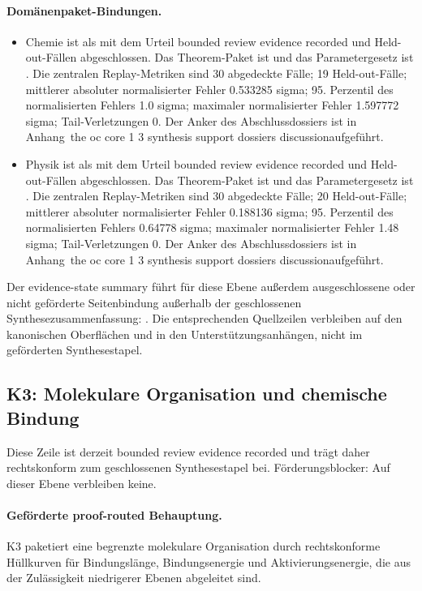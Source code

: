 \paragraph{Domänenpaket-Bindungen.}
\begin{itemize}[leftmargin=1.6em,nosep]
\item Chemie ist als  mit dem Urteil bounded review evidence recorded und  Held-out-Fällen abgeschlossen. Das Theorem-Paket ist  und das Parametergesetz ist . Die zentralen Replay-Metriken sind 30 abgedeckte Fälle; 19 Held-out-Fälle; mittlerer absoluter normalisierter Fehler 0.533285 sigma; 95. Perzentil des normalisierten Fehlers 1.0 sigma; maximaler normalisierter Fehler 1.597772 sigma; Tail-Verletzungen 0. Der Anker des Abschlussdossiers ist in Anhang~the oc core 1 3 synthesis support dossiers discussionaufgeführt.
\item Physik ist als  mit dem Urteil bounded review evidence recorded und  Held-out-Fällen abgeschlossen. Das Theorem-Paket ist  und das Parametergesetz ist . Die zentralen Replay-Metriken sind 30 abgedeckte Fälle; 20 Held-out-Fälle; mittlerer absoluter normalisierter Fehler 0.188136 sigma; 95. Perzentil des normalisierten Fehlers 0.64778 sigma; maximaler normalisierter Fehler 1.48 sigma; Tail-Verletzungen 0. Der Anker des Abschlussdossiers ist in Anhang~the oc core 1 3 synthesis support dossiers discussionaufgeführt.
\end{itemize}
Der evidence-state summary führt für diese Ebene außerdem  ausgeschlossene oder nicht geförderte Seitenbindung außerhalb der geschlossenen Synthesezusammenfassung: . Die entsprechenden Quellzeilen verbleiben auf den kanonischen Oberflächen und in den Unterstützungsanhängen, nicht im geförderten Synthesestapel.

\subsection{K3: Molekulare Organisation und chemische Bindung}
\label{sec:oc-core-1-3-synthesis-k3}
Diese Zeile ist derzeit bounded review evidence recorded und trägt daher rechtskonform zum geschlossenen Synthesestapel bei.
Förderungsblocker: Auf dieser Ebene verbleiben keine.

\paragraph{Geförderte proof-routed Behauptung.}
K3 paketiert eine begrenzte molekulare Organisation durch rechtskonforme Hüllkurven für Bindungslänge, Bindungsenergie und Aktivierungsenergie, die aus der Zulässigkeit niedrigerer Ebenen abgeleitet sind.

